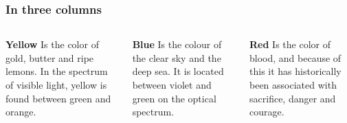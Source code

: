 \begin{frame}
\frametitle{In three columns}
\begin{columns}[T]
    \begin{column}{0.3\textwidth}
    \textbf{Yellow}
    \small
    Is the color of gold, butter and ripe lemons. In the spectrum of visible light, yellow is found between green and orange.
    \end{column}
    
    \begin{column}{0.3\textwidth}
    \textbf{Blue}
    \small
    Is the colour of the clear sky and the deep sea. It is located between violet and green on the optical spectrum.
    \end{column}
    
    \begin{column}{0.3\textwidth}
    \textbf{Red}
    \small
    Is the color of blood, and because of this it has historically been associated with sacrifice, danger and courage.
    \end{column}
\end{columns}
\end{frame}